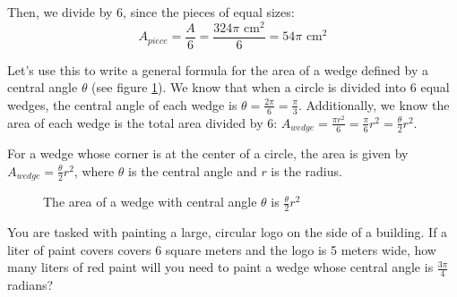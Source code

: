 Then, we divide by 6, since the pieces of equal sizes:
$$A_{piece} = \frac{A}{6} = \frac{324\pi\text{ cm}^2}{6} = 54\pi\text{ cm}^2$$

Let's use this to write a general formula for the area of a wedge defined by a 
central angle $\theta$ (see figure \ref{fig:wedge}). We know that when a 
circle is divided into 6 equal wedges, the central angle of each wedge is 
$\theta = \frac{2\pi}{6} = \frac{\pi}{3}$. Additionally, we know the area of 
each wedge is the total area divided by 6: $A_{wedge} = \frac{\pi r^2}{6} = 
\frac{\pi}{6} r^2 = \frac{\theta}{2} r^2$. 

\begin{mdframed}[style=important, frametitle={Area of a Wedge}]
For a wedge whose corner 
is at the center of a circle, the area is given by $A_{wedge} = \frac{\theta}{2} 
r^2$, where $\theta$ is the central angle and $r$ is the radius. 

\end{mdframed}

\begin{figure}[htbp]
\centering
{}
    \caption{The area of a wedge with central angle $\theta$ is $\frac{\theta}{2}r^2$}
    \label{fig:wedge}
\end{figure}

\begin{Exercise}[title = {Area of a Wedge}, label = wedge]
You are tasked with painting a large, circular logo on the side of a building. 
If a liter of paint covers covers 6 square meters and the logo is 5 meters 
wide, how many liters of red paint will you need to paint a wedge whose central 
angle is $\frac{3\pi}{4}$ radians?
\end{Exercise}

